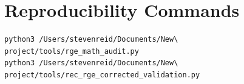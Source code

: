 \documentclass[11pt,a4paper]{article}
\begin{document}
\section{Reproducibility Commands}
\begin{verbatim}
python3 /Users/stevenreid/Documents/New\ project/tools/rge_math_audit.py
python3 /Users/stevenreid/Documents/New\ project/tools/rec_rge_corrected_validation.py
\end{verbatim}
\end{document}
